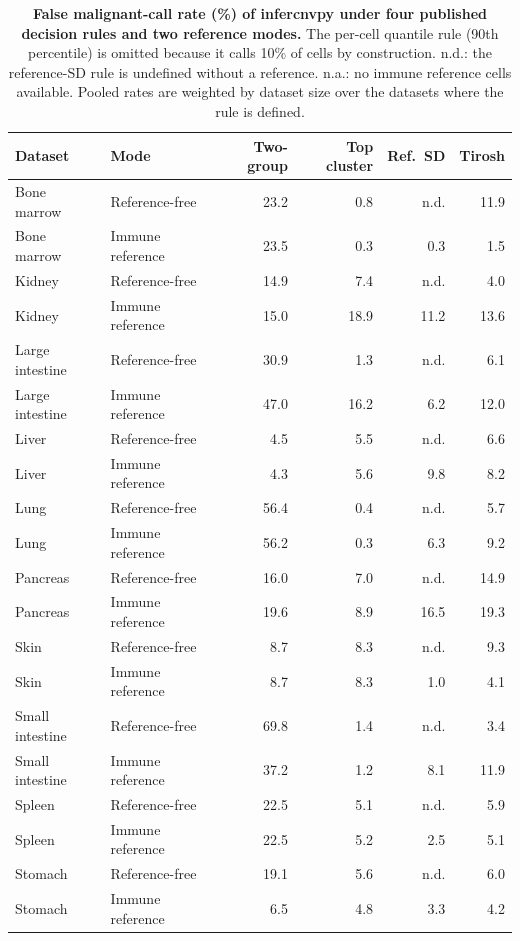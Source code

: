 \begin{table}[htbp]
\centering
\caption{\textbf{False malignant-call rate (\%) of infercnvpy under four published decision rules and two reference modes.} The per-cell quantile rule (90th percentile) is omitted because it calls 10\% of cells by construction. n.d.: the reference-SD rule is undefined without a reference. n.a.: no immune reference cells available. Pooled rates are weighted by dataset size over the datasets where the rule is defined.}
\label{tab:s1}
\scriptsize
\begin{tabular}{@{}llrrrr@{}}
\toprule
Dataset & Mode & Two-group & Top cluster & Ref.\ SD & Tirosh \\
\midrule
Bone marrow & Reference-free & 23.2 & 0.8 & n.d. & 11.9 \\
Bone marrow & Immune reference & 23.5 & 0.3 & 0.3 & 1.5 \\
Kidney & Reference-free & 14.9 & 7.4 & n.d. & 4.0 \\
Kidney & Immune reference & 15.0 & 18.9 & 11.2 & 13.6 \\
Large intestine & Reference-free & 30.9 & 1.3 & n.d. & 6.1 \\
Large intestine & Immune reference & 47.0 & 16.2 & 6.2 & 12.0 \\
Liver & Reference-free & 4.5 & 5.5 & n.d. & 6.6 \\
Liver & Immune reference & 4.3 & 5.6 & 9.8 & 8.2 \\
Lung & Reference-free & 56.4 & 0.4 & n.d. & 5.7 \\
Lung & Immune reference & 56.2 & 0.3 & 6.3 & 9.2 \\
Pancreas & Reference-free & 16.0 & 7.0 & n.d. & 14.9 \\
Pancreas & Immune reference & 19.6 & 8.9 & 16.5 & 19.3 \\
Skin & Reference-free & 8.7 & 8.3 & n.d. & 9.3 \\
Skin & Immune reference & 8.7 & 8.3 & 1.0 & 4.1 \\
Small intestine & Reference-free & 69.8 & 1.4 & n.d. & 3.4 \\
Small intestine & Immune reference & 37.2 & 1.2 & 8.1 & 11.9 \\
Spleen & Reference-free & 22.5 & 5.1 & n.d. & 5.9 \\
Spleen & Immune reference & 22.5 & 5.2 & 2.5 & 5.1 \\
Stomach & Reference-free & 19.1 & 5.6 & n.d. & 6.0 \\
Stomach & Immune reference & 6.5 & 4.8 & 3.3 & 4.2 \\

\end{tabular}
\end{table}
